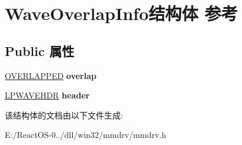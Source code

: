 \hypertarget{struct_wave_overlap_info}{}\section{Wave\+Overlap\+Info结构体 参考}
\label{struct_wave_overlap_info}
\subsection*{Public 属性}
\begin{DoxyCompactItemize}
\item 
\mbox{\label{struct_wave_overlap_info_aa45e33338876fbcc33859ad9f66b4b5f}} 
\hyperlink{struct___o_v_e_r_l_a_p_p_e_d}{O\+V\+E\+R\+L\+A\+P\+P\+ED} {\bfseries overlap}
\item 
\mbox{\label{struct_wave_overlap_info_a13319c85b79a9648d47368ab1abde21f}} 
\hyperlink{structwavehdr__tag}{L\+P\+W\+A\+V\+E\+H\+DR} {\bfseries header}
\end{DoxyCompactItemize}


该结构体的文档由以下文件生成\+:\begin{DoxyCompactItemize}
\item 
E\+:/\+React\+O\+S-\/0../dll/win32/mmdrv/mmdrv.\+h\end{DoxyCompactItemize}
